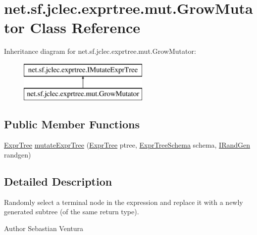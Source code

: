 \hypertarget{classnet_1_1sf_1_1jclec_1_1exprtree_1_1mut_1_1_grow_mutator}{\section{net.\-sf.\-jclec.\-exprtree.\-mut.\-Grow\-Mutator Class Reference}
\label{classnet_1_1sf_1_1jclec_1_1exprtree_1_1mut_1_1_grow_mutator}
}
Inheritance diagram for net.\-sf.\-jclec.\-exprtree.\-mut.\-Grow\-Mutator\-:\begin{figure}[H]
\begin{center}
\leavevmode
\includegraphics[height=2.000000cm]{classnet_1_1sf_1_1jclec_1_1exprtree_1_1mut_1_1_grow_mutator}
\end{center}
\end{figure}
\subsection*{Public Member Functions}
\begin{DoxyCompactItemize}
\item 
\hyperlink{classnet_1_1sf_1_1jclec_1_1exprtree_1_1_expr_tree}{Expr\-Tree} \hyperlink{classnet_1_1sf_1_1jclec_1_1exprtree_1_1mut_1_1_grow_mutator_ab56c2cddadd8902dc11958c3387882cb}{mutate\-Expr\-Tree} (\hyperlink{classnet_1_1sf_1_1jclec_1_1exprtree_1_1_expr_tree}{Expr\-Tree} ptree, \hyperlink{classnet_1_1sf_1_1jclec_1_1exprtree_1_1_expr_tree_schema}{Expr\-Tree\-Schema} schema, \hyperlink{interfacenet_1_1sf_1_1jclec_1_1util_1_1random_1_1_i_rand_gen}{I\-Rand\-Gen} randgen)
\end{DoxyCompactItemize}


\subsection{Detailed Description}
Randomly select a terminal node in the expression and replace it with a newly generated subtree (of the same return type).

\begin{DoxyAuthor}{Author}
Sebastian Ventura 
\end{DoxyAuthor}


